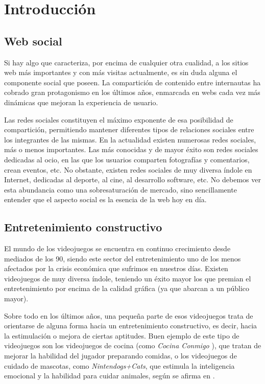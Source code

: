 \documentclass[12pt,a4paper]{article}
\begin{document}
\section{Introducción}
\label{sec:intro}

\subsection{Web social}

Si hay algo que caracteriza, por encima de cualquier otra cualidad, a los sitios web más importantes y con más visitas actualmente, es sin duda alguna el componente social que poseen. La compartición de contenido entre internautas ha cobrado gran protagonismo en los últimos años, enmarcada en webs cada vez más dinámicas que mejoran la experiencia de usuario. 

Las redes sociales constituyen el máximo exponente de esa posibilidad de compartición, permitiendo mantener diferentes tipos de relaciones sociales entre los integrantes de las mismas. En la actualidad existen numerosas redes sociales, más o menos importantes. Las más conocidas y de mayor éxito son redes sociales dedicadas al ocio, en las que los usuarios comparten fotografías y comentarios, crean eventos, etc. No obstante, existen redes sociales de muy diversa índole en Internet, dedicadas al deporte, al cine, al desarrollo software, etc. No debemos ver esta abundancia como una sobresaturación de mercado, sino sencillamente entender que el aspecto social es la esencia de la web hoy en día.

\subsection{Entretenimiento constructivo}

El mundo de los videojuegos se encuentra en continuo crecimiento desde mediados de los 90, siendo este sector del entretenimiento uno de los menos afectados por la crisis económica que sufrimos en nuestros días. Existen videojuegos de muy diversa índole, teniendo un éxito mayor los que premian el entretenimiento por encima de la calidad gráfica (ya que abarcan a un público mayor).

Sobre todo en los últimos años, una pequeña parte de esos videojuegos trata de orientarse de alguna forma hacia un entretenimiento constructivo, es decir, hacia la estimulación o mejora de ciertas aptitudes. Buen ejemplo de este tipo de videojuegos son los videojuegos de cocina (como {\it Cocina Conmigo} \cite{cocinaconmigo}), que tratan de mejorar la habilidad del jugador preparando comidas, o los videojuegos de cuidado de mascotas, como {\it Nintendogs+Cats}, que estimula la inteligencia emocional y la habilidad para cuidar animales, según se afirma en \cite{mascotas}.
\end{document}
